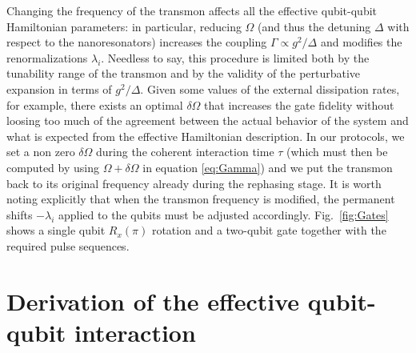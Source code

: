 \documentclass[aps,twocolumn,groupedaddress,superscriptaddress,floatfix,amsmath,amssymb,prb]{revtex4-1}
\begin{document}
Changing the frequency of the transmon affects all the effective qubit-qubit Hamiltonian parameters: in particular, reducing $\Omega$ (and thus the detuning $\Delta$ with respect to the nanoresonators) increases the coupling $\Gamma \propto g^2/\Delta$ and modifies the renormalizations $\lambda_i$. Needless to say, this procedure is limited both by the tunability range of the transmon and by the validity of the perturbative expansion in terms of $g^2/\Delta$. Given some values of the external dissipation rates, for example, there exists an optimal $\delta\Omega$ that increases the gate fidelity without loosing too much of the agreement between the actual behavior of the system and what is expected from the effective Hamiltonian description. In our protocols, we set a non zero $\delta\Omega$ during the coherent interaction time $\tau$ (which must then be computed by using $\Omega+\delta\Omega$ in equation \ref{eq:Gamma}) and we put the transmon back to its original frequency already during the rephasing stage. It is worth noting explicitly that when the transmon frequency is modified, the permanent shifts $-\lambda_i$ applied to the qubits must be adjusted accordingly. Fig.~\ref{fig:Gates} shows a single qubit $R_x(\pi)$ rotation and a two-qubit gate together with the required pulse sequences.

\section{Derivation of the effective qubit-qubit interaction}
\label{app:Heff}
\end{document}

